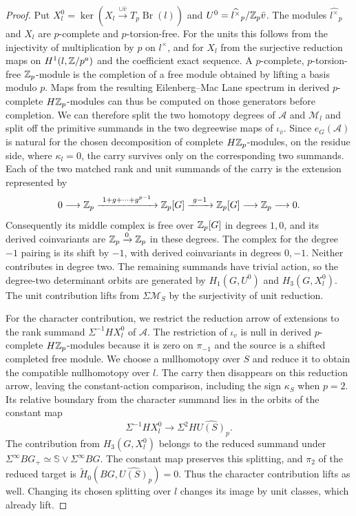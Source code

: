 \begin{proof}
Put $X_l^0=\ker(X_l\xrightarrow{\cup\bar v}T_p\operatorname{Br}(l))$ and $U^0=\widehat{l^\times}_p/\mathbb Z_p\bar v$.
The modules $\widehat{l^\times}_p$ and $X_l$ are $p$-complete and $p$-torsion-free.
For the units this follows from the injectivity of multiplication by $p$ on $l^\times$, and for $X_l$ from the surjective reduction maps on $H^1(l,\mathbb Z/p^a)$ and the coefficient exact sequence.
A $p$-complete, $p$-torsion-free $\mathbb Z_p$-module is the completion of a free module obtained by lifting a basis modulo $p$.
Maps from the resulting Eilenberg--Mac Lane spectrum in derived $p$-complete $H\mathbb Z_p$-modules can thus be computed on those generators before completion.
We can therefore split the two homotopy degrees of $\mathcal A$ and $\mathcal M_l$ and split off the primitive summands in the two degreewise maps of $\iota_{\bar v}$.
Since $e_G(\mathcal A)$ is natural for the chosen decomposition of complete $H\mathbb Z_p$-modules, on the residue side, where $\kappa_l=0$, the carry survives only on the corresponding two summands.
Each of the two matched rank and unit summands of the carry is the extension represented by
\[
 0\longrightarrow\Z_p\xrightarrow{\ 1+g+\cdots+g^{p-1}\ }\Z_p[G]
 \xrightarrow{\ g-1\ }\Z_p[G]\longrightarrow\Z_p\longrightarrow0.
\]
Consequently its middle complex is free over $\mathbb Z_p[G]$ in degrees $1,0$, and its derived coinvariants are $\mathbb Z_p\xrightarrow{0}\mathbb Z_p$ in these degrees.
The complex for the degree $-1$ pairing is its shift by $-1$, with derived coinvariants in degrees $0,-1$.
Neither contributes in degree two.
The remaining summands have trivial action, so the degree-two determinant orbits are generated by $H_1(G,U^0)$ and $H_3(G,X_l^0)$.
The unit contribution lifts from $\Sigma\mathcal M_S$ by the surjectivity of unit reduction.

For the character contribution, we restrict the reduction arrow of extensions to the rank summand $\Sigma^{-1}HX_l^0$ of $\mathcal A$.
The restriction of $\iota_v$ is null in derived $p$-complete $H\mathbb Z_p$-modules because it is zero on $\pi_{-1}$ and the source is a shifted completed free module.
We choose a nullhomotopy over $S$ and reduce it to obtain the compatible nullhomotopy over $l$.
The carry then disappears on this reduction arrow, leaving the constant-action comparison, including the sign $\kappa_S$ when $p=2$.
Its relative boundary from the character summand lies in the orbits of the constant map
\[
 \Sigma^{-1}HX_l^0\longrightarrow\Sigma^2H\widehat{U(S)}_p .
\]
The contribution from $H_3(G,X_l^0)$ belongs to the reduced summand under $\Sigma^\infty BG_+\simeq\mathbb S\vee\Sigma^\infty BG$.
The constant map preserves this splitting, and $\pi_2$ of the reduced target is $\widetilde H_0(BG,\widehat{U(S)}_p)=0$.
Thus the character contribution lifts as well.
Changing its chosen splitting over $l$ changes its image by unit classes, which already lift.
\end{proof}

